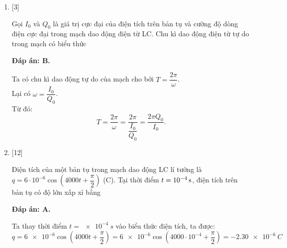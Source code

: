 \begin{enumerate}[label=\bfseries Câu \arabic*:]
{	}

	\item {} [3]
	
	\cauhoi
	{Gọi $I_0$ và $Q_0$ là giá trị cực đại của điện tích trên bản tụ và cường độ dòng điện cực đại trong mạch dao động điện từ LC. Chu kì dao động điện từ tự do trong mạch có biểu thức
	}
	
	\loigiai
	{		\textbf{Đáp án: B.}
		
		Ta có chu kì dao động tự do của mạch cho bởi $T = \dfrac{2\pi}{\omega}$. \\
		Lại có $\omega = \dfrac{I_0}{Q_0}$. \\
		Từ đó:
		$$T = \dfrac{2\pi}{\omega} = \dfrac{2\pi}{\dfrac{I_0}{Q_0}} = \dfrac{2\pi Q_0}{I_0}.$$
		
	}

	\item {} [12]
	
	\cauhoi
	{Điện tích của một bản tụ trong mạch dao động LC lí tưởng là $q = 6\cdot10^{-6} \cos \left( 4000t + \dfrac{\pi}{2} \right)$ (C). Tại thời điểm $t = \xsi{10^{-4}}{s}$, điện tích trên bản tụ có độ lớn xấp xỉ bằng 
	}
	
	\loigiai
	{		\textbf{Đáp án: A.}
		
		Ta thay thời điểm $t = \SI{e-4}{s}$ vào biểu thức điện tích, ta được:
		$$
		q = \num{6e-6} \cos \left( 4000t + \dfrac{\pi}{2} \right) = \num{6e-6}\cos \left( 4000\cdot10^{-4} + \dfrac{\pi}{2} \right) = -\SI{2,30 e-6}{C}
		$$
		
}
\end{enumerate}
